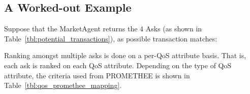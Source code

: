 \documentclass[10pt,journal,compsoc]{IEEEtran}
\begin{document}
\subsection{A Worked-out Example}
Suppose that the MarketAgent returns the 4 Asks (as shown in Table~\ref{tbl:potential_transactions}), as possible transaction matches:
\begin{table}
\centering
{}
\qquad
{}
\qquad 
{}
\qquad
{}
\caption{Asks returned by MarketAgent as potential transactions \label{tbl:potential_transactions}}
\end{table}

Ranking amongst multiple asks is done on a per-QoS attribute basis. That is, each ask is ranked on each QoS attribute. Depending on the type of QoS attribute, the criteria used from PROMETHEE is shown in Table~\ref{tbl:qos_promethee_mapping}.
\end{document}
